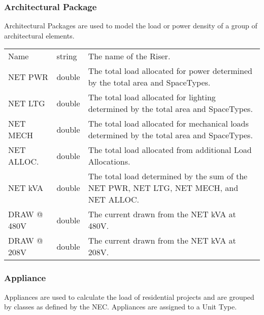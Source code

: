 \documentclass[letterpaper,10pt,english]{sphinxmanual}
\begin{document}
\subsubsection{Architectural Package}
\label{\detokenize{docs/definitions/index-definitions:architectural-package}}\label{\detokenize{docs/definitions/index-definitions:architectural-package-definition}}
Architectural Packages are used to model the load or power density of a group of architectural elements.


\begin{savenotes}\sphinxattablestart
\centering
\begin{tabulary}{\linewidth}[t]{|T|T|T|}
\hline
\sphinxstyletheadfamily 
{}
&\sphinxstyletheadfamily 
{}
&\sphinxstyletheadfamily 
{}
\\
\hline
Name
&
string
&
The name of the Riser.
\\
\hline
NET PWR
&
double
&
The total load allocated for power determined by the total area and SpaceTypes.
\\
\hline
NET LTG
&
double
&
The total load allocated for lighting determined by the total area and SpaceTypes.
\\
\hline
NET MECH
&
double
&
The total load allocated for mechanical loads determined by the total area and SpaceTypes.
\\
\hline
NET ALLOC.
&
double
&
The total load allocated from additional Load Allocations.
\\
\hline
NET kVA
&
double
&
The total load determined by the sum of the NET PWR, NET LTG, NET MECH, and NET ALLOC.
\\
\hline
DRAW @ 480V
&
double
&
The current drawn from the NET kVA at 480V.
\\
\hline
DRAW @ 208V
&
double
&
The current drawn from the NET kVA at 208V.
\\
\hline
\end{tabulary}
\par
\sphinxattableend\end{savenotes}


\subsubsection{Appliance}
\label{\detokenize{docs/definitions/index-definitions:appliance}}\label{\detokenize{docs/definitions/index-definitions:appliance-definition}}
Appliances are used to calculate the load of residential projects and are grouped by classes as defined by the NEC.  Appliances are assigned to a Unit Type.
\end{document}
